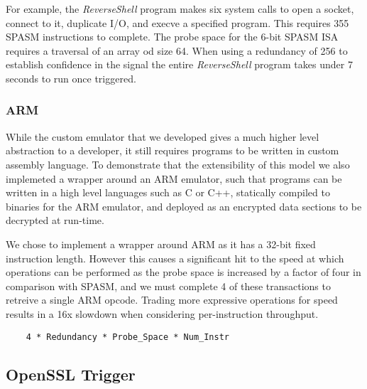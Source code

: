 For example, the \textit{ReverseShell} program makes six system calls to open a socket,
connect to it, duplicate I/O, and execve a specified program. This requires 355
SPASM instructions to complete. The probe space for the 6-bit SPASM ISA requires 
a traversal of an array od size 64. When using a redundancy of 256 to establish
confidence in the signal the entire \textit{ReverseShell} program takes under 7 
seconds to run once triggered. 

\FigSpasmModel

\subsubsection{ARM}
\label{subsubsec:arm}
While the custom emulator that we developed gives a much higher level abstraction to 
a developer, it still requires programs to be written in custom assembly 
language. To demonstrate that the extensibility of this model we also implemeted a wrapper
around an ARM emulator, such that programs can be written in a high level languages 
such as C or C++, statically compiled to binaries for the ARM emulator, and deployed 
as an encrypted data sections to be decrypted at run-time.  



We chose to implement a wrapper around ARM as it has a 32-bit fixed instruction
length. However this causes a significant hit to the speed at which operations 
can be performed as the probe space is increased by a factor of four in 
comparison with SPASM,  and we must complete 4 of these transactions to 
retreive a single ARM opcode. Trading more expressive operations for speed
results in a 16x slowdown when considering per-instruction throughput. 

\begin{lstlisting}
    4 * Redundancy * Probe_Space * Num_Instr
\end{lstlisting}

\subsection{OpenSSL Trigger}

%
%


